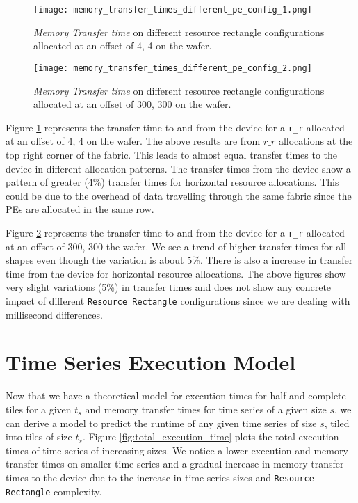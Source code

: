 \begin{figure}[h!]
    \texttt{[image: memory\_transfer\_times\_different\_pe\_config\_1.png]}
    \centering
    \caption{\textit{Memory Transfer time} on different resource rectangle configurations allocated at an offset of 4, 4 on the wafer.}
    \label{fig:memory_transfer_times_start}
\end{figure}

\begin{figure}[h!]
    \texttt{[image: memory\_transfer\_times\_different\_pe\_config\_2.png]}
    \centering
    \caption{\textit{Memory Transfer time} on different resource rectangle configurations allocated at an offset of 300, 300 on the wafer.}
    \label{fig:memory_transfer_times_middle}
\end{figure}

Figure \ref{fig:memory_transfer_times_start} represents the transfer time to and from the device for a \texttt{r\_r} allocated at an offset of 4, 4 on the wafer. The above results are from $r\_r$ allocations at the top right corner of the fabric. This leads to almost equal transfer times to the device in different allocation patterns. The transfer times from the device show a pattern of greater (4\%) transfer times for horizontal resource allocations. This could be due to the overhead of data travelling through the same fabric since the PEs are allocated in the same row.

Figure \ref{fig:memory_transfer_times_middle} represents the transfer time to and from the device for a \texttt{r\_r} allocated at an offset of 300, 300 the wafer. We see a trend of higher transfer times for all shapes even though the variation is about 5\%. There is also a increase in transfer time from the device for horizontal resource allocations. The above figures show very slight variations (5\%) in transfer times and does not show any concrete impact of different \texttt{Resource Rectangle} configurations since we are dealing with millisecond differences.

\section{Time Series Execution Model} \label{subsection:time_series_model}

Now that we have a theoretical model for execution times for half and complete tiles for a given $t_s$ and memory transfer times for time series of a given size $s$, we can derive a model to predict the runtime of any given time series of size $s$, tiled into tiles of size $t_s$. Figure \ref{fig:total_execution_time} plots the total execution times of time series of increasing sizes. We notice a lower execution and memory transfer times on smaller time series and a gradual increase in memory transfer times to the device due to the increase in time series sizes and \texttt{Resource Rectangle} complexity.

